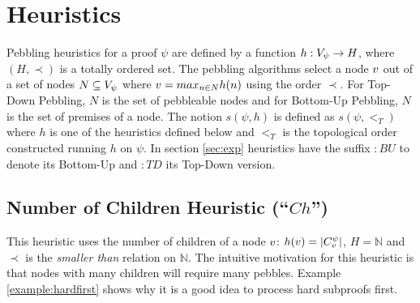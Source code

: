 \documentclass{llncs}
\begin{document}
\section{Heuristics}
\label{sec:heuristics}


Pebbling heuristics for a proof $\psi$ are defined by a function $h: V_{\psi} \rightarrow H$, where $(H,\prec)$ is a totally ordered set. 
The pebbling algorithms select a node $v$ out of a set of nodes $N \subseteq V_{\psi}$ where $v = max_{n \in N} h(n)$ using the order $\prec$.
For Top-Down Pebbling, $N$ is the set of pebbleable nodes and for Bottom-Up Pebbling, $N$ is the set of premises of a node.
The notion $s(\psi,h)$ is defined as $s(\psi,<_T)$ where $h$ is one of the heuristics defined below and $<_T$ is the topological order constructed running $h$ on $\psi$.
In section \ref{sec:exp} heuristics have the suffix $:BU$ to denote its Bottom-Up and $:TD$ its Top-Down version.

\subsection{Number of Children Heuristic (``$Ch$'')}
\label{sec:children}
This heuristic uses the number of children of a node $v$: $h(v) = |C_{v}^{\psi}|$, $H = \mathbb{N}$ and $\prec$ is the \emph{smaller than} relation on $\mathbb{N}$.
The intuitive motivation for this heuristic is that nodes with many children will require many pebbles. Example \ref{example:hardfirst} shows why it is a good idea to process hard subproofs first.
\end{document}

